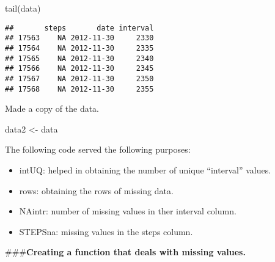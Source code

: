 \documentclass[
]{article}
\newenvironment{Shaded}{\begin{snugshade}}{\end{snugshade}}
\newcommand{\DecValTok}[1]{\textcolor[rgb]{0.00,0.00,0.81}{#1}}
\newcommand{\FunctionTok}[1]{\textcolor[rgb]{0.00,0.00,0.00}{#1}}
\newcommand{\NormalTok}[1]{#1}
\newcommand{\OtherTok}[1]{\textcolor[rgb]{0.56,0.35,0.01}{#1}}
\newcommand{\SpecialCharTok}[1]{\textcolor[rgb]{0.00,0.00,0.00}{#1}}
\begin{document}
\begin{Shaded}
\begin{Highlighting}[]
\FunctionTok{tail}\NormalTok{(data)}
\end{Highlighting}
\end{Shaded}

\begin{verbatim}
##       steps       date interval
## 17563    NA 2012-11-30     2330
## 17564    NA 2012-11-30     2335
## 17565    NA 2012-11-30     2340
## 17566    NA 2012-11-30     2345
## 17567    NA 2012-11-30     2350
## 17568    NA 2012-11-30     2355
\end{verbatim}

Made a copy of the data.

\begin{Shaded}
\begin{Highlighting}[]
\NormalTok{data2 }\OtherTok{\textless{}{-}}\NormalTok{ data}
\end{Highlighting}
\end{Shaded}

The following code served the following purposes:

\begin{itemize}
\item
  intUQ: helped in obtaining the number of unique ``interval'' values.
\item
  rows: obtaining the rows of missing data.
\item
  NAintr: number of missing values in ther interval column.
\item
  STEPSna: missing values in the steps column.
\end{itemize}

\begin{Shaded}
\end{Shaded}

\#\#\#\textbf{Creating a function that deals with missing values.}
\end{document}
